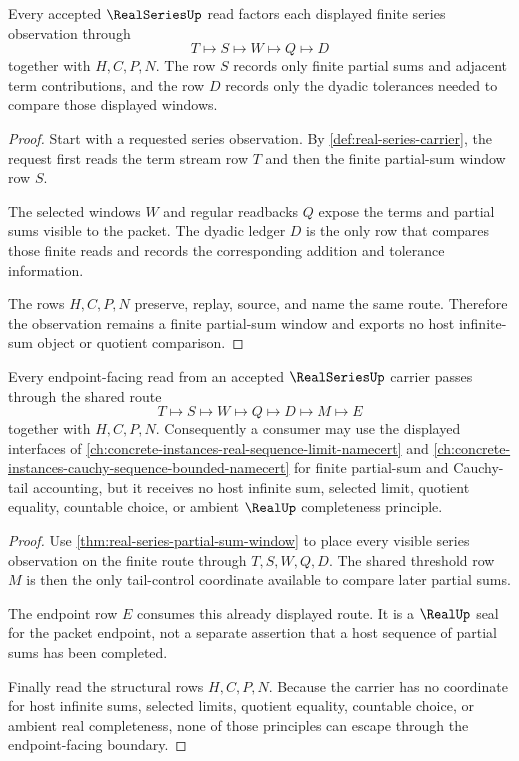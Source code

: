 \begin{theorem}\label{thm:real-series-partial-sum-window}
Every accepted $\RealSeriesUp$ read factors each displayed finite series observation through
$$
T\longmapsto S\longmapsto W\longmapsto Q\longmapsto D
$$
together with $H,C,P,N$. The row $S$ records only finite partial sums and adjacent term contributions, and the row $D$ records only the dyadic tolerances needed to compare those displayed windows.
\end{theorem}
\begin{proof}
Start with a requested series observation. By \autoref{def:real-series-carrier}, the request first reads the term stream row $T$ and then the finite partial-sum window row $S$.

The selected windows $W$ and regular readbacks $Q$ expose the terms and partial sums visible to the packet. The dyadic ledger $D$ is the only row that compares those finite reads and records the corresponding addition and tolerance information.

The rows $H,C,P,N$ preserve, replay, source, and name the same route. Therefore the observation remains a finite partial-sum window and exports no host infinite-sum object or quotient comparison.
\end{proof}

\begin{theorem}\label{thm:real-series-nonescape-boundary}
Every endpoint-facing read from an accepted $\RealSeriesUp$ carrier passes through the shared route
$$
T\longmapsto S\longmapsto W\longmapsto Q\longmapsto D\longmapsto M\longmapsto E
$$
together with $H,C,P,N$. Consequently a consumer may use the displayed interfaces of \autoref{ch:concrete-instances-real-sequence-limit-namecert} and \autoref{ch:concrete-instances-cauchy-sequence-bounded-namecert} for finite partial-sum and Cauchy-tail accounting, but it receives no host infinite sum, selected limit, quotient equality, countable choice, or ambient $\RealUp$ completeness principle.
\end{theorem}
\begin{proof}
Use \autoref{thm:real-series-partial-sum-window} to place every visible series observation on the finite route through $T,S,W,Q,D$. The shared threshold row $M$ is then the only tail-control coordinate available to compare later partial sums.

The endpoint row $E$ consumes this already displayed route. It is a $\RealUp$ seal for the packet endpoint, not a separate assertion that a host sequence of partial sums has been completed.

Finally read the structural rows $H,C,P,N$. Because the carrier has no coordinate for host infinite sums, selected limits, quotient equality, countable choice, or ambient real completeness, none of those principles can escape through the endpoint-facing boundary.
\end{proof}

